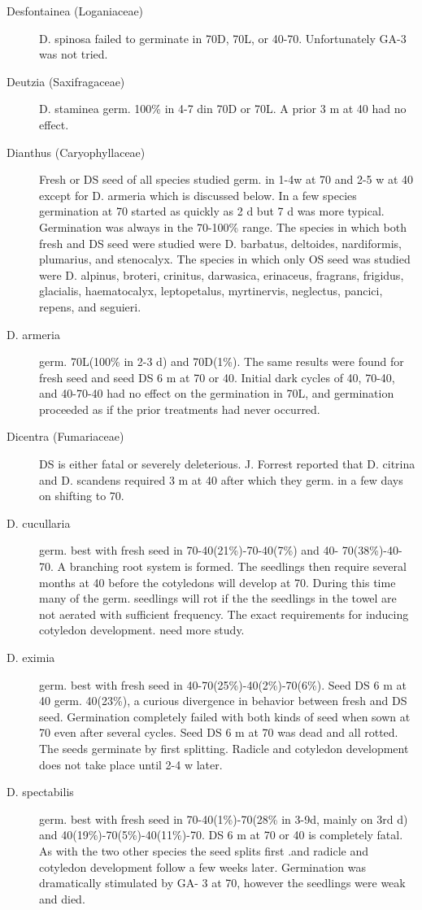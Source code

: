 \begin{description}
\item[Desfontainea (Loganiaceae)] D. spinosa failed to germinate in 70D, 70L,
or 40-70. Unfortunately GA-3 was not tried.
\item[Deutzia (Saxifragaceae)] D. staminea germ. 100\% in 4-7 din 70D or 70L.
A prior 3 m at 40 had no effect.

\item[Dianthus (Caryophyllaceae)] Fresh or DS seed of all species studied
germ. in 1-4w at 70 and 2-5 w at 40 except for D. armeria which is discussed below.
In a few species germination at 70 started as quickly as 2 d but 7 d was more typical.
Germination was always in the 70-100\% range. The species in which both fresh and
DS seed were studied were D. barbatus, deltoides, nardiformis, plumarius, and
stenocalyx. The species in which only OS seed was studied were D. alpinus, broteri,
crinitus, darwasica, erinaceus, fragrans, frigidus, glacialis, haematocalyx, leptopetalus,
myrtinervis, neglectus, pancici, repens, and seguieri.

\item[D. armeria] germ. 70L(100\% in 2-3 d) and 70D(1\%). The same results were
found for fresh seed and seed DS 6 m at 70 or 40. Initial dark cycles of 40, 70-40, and
40-70-40 had no effect on the germination in 70L, and germination proceeded as if the
prior treatments had never occurred.

\item[Dicentra (Fumariaceae)] DS is either fatal or severely deleterious. J.
Forrest reported that D. citrina and D. scandens required 3 m at 40 after which they
germ. in a few days on shifting to 70.
\item[D. cucullaria] germ. best with fresh seed in 70-40(21\%)-70-40(7\%) and 40-
70(38\%)-40-70. A branching root system is formed. The seedlings then require
several months at 40 before the cotyledons will develop at 70. During this time many
of the germ. seedlings will rot if the the seedlings in the towel are not aerated with
sufficient frequency. The exact requirements for inducing cotyledon development.
need more study.
\item[D. eximia] germ. best with fresh seed in 40-70(25\%)-40(2\%)-70(6\%). Seed DS
6 m at 40 germ. 40(23\%), a curious divergence in behavior between fresh and DS
seed. Germination completely failed with both kinds of seed when sown at 70 even
after several cycles. Seed DS 6 m at 70 was dead and all rotted. The seeds
germinate by first splitting. Radicle and cotyledon development does not take place
until 2-4 w later.
\item[D. spectabilis] germ. best with fresh seed in 70-40(1\%)-70(28\% in 3-9d, mainly
on 3rd d) and 40(19\%)-70(5\%)-40(11\%)-70. DS 6 m at 70 or 40 is completely fatal.
As with the two other species the seed splits first .and radicle and cotyledon
development follow a few weeks later. Germination was dramatically stimulated by GA-
3 at 70, however the seedlings were weak and died.


\end{description}
